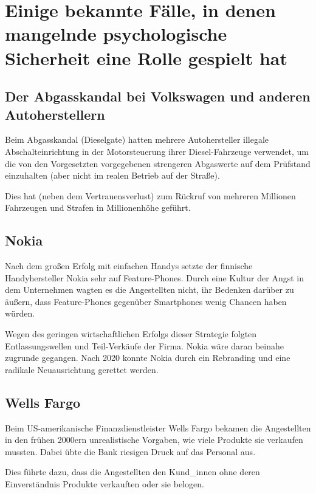 \section{Einige bekannte Fälle, in denen mangelnde psychologische Sicherheit eine Rolle gespielt hat}
\label{ps-faelle}

\subsection{Der Abgasskandal bei Volkswagen und anderen Autoherstellern}

Beim Abgasskandal (\glqq Dieselgate\grqq) hatten mehrere Autohersteller illegale Abschalteinrichtung in der Motorsteuerung ihrer Diesel-Fahrzeuge verwendet, um die von den Vorgesetzten vorgegebenen strengeren Abgaswerte auf dem Prüfstand einzuhalten (aber nicht im realen Betrieb auf der Straße).

Dies hat (neben dem Vertrauensverlust) zum Rückruf von mehreren Millionen Fahrzeugen und Strafen in Millionenhöhe geführt.

\subsection{Nokia}

Nach dem großen Erfolg mit einfachen Handys setzte der finnische Handyhersteller Nokia sehr auf Feature-Phones. Durch eine Kultur der Angst in dem Unternehmen wagten es die Angestellten nicht, ihr Bedenken darüber zu äußern, dass Feature-Phones gegenüber Smartphones wenig Chancen haben würden.

Wegen des geringen wirtschaftlichen Erfolgs dieser Strategie folgten Entlassungswellen und Teil-Verkäufe der Firma. Nokia wäre daran beinahe zugrunde gegangen. Nach 2020 konnte Nokia durch ein Rebranding und eine radikale Neuausrichtung gerettet werden.

\subsection{Wells Fargo}

Beim US-amerikanische Finanzdienstleister Wells Fargo bekamen die Angestellten in den frühen 2000ern unrealistische Vorgaben, wie viele Produkte sie verkaufen mussten. Dabei übte die Bank riesigen Druck auf das Personal aus.

Dies führte dazu, dass die Angestellten den Kund\_innen ohne deren Einverständnis Produkte verkauften oder sie belogen.

